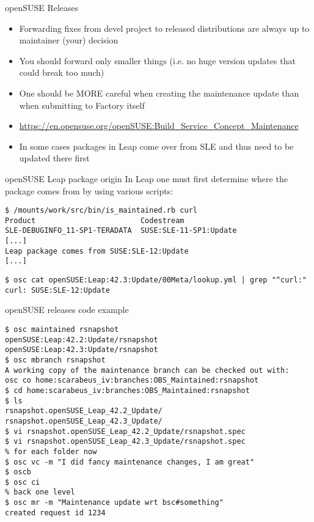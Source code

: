 \documentclass{beamer}
\begin{document}
\begin{frame}[t]{openSUSE Releases}
	\begin{itemize}
	\item Forwarding fixes from devel project to released distributions are always up to maintainer (your) decision
	\item You should forward only smaller things (i.e. no huge version updates that could break too much)
	\item One should be MORE careful when creating the maintenance update than when submitting to Factory itself
	\item \url{https://en.opensuse.org/openSUSE:Build\_Service\_Concept\_Maintenance}
	\item In some cases packages in Leap come over from SLE and thus need to be updated there first
	\end{itemize}
\end{frame}

\begin{frame}[fragile]{openSUSE Leap package origin}
In Leap one must first determine where the package comes from by using various
scripts:
\begin{small}
\begin{verbatim}$ /mounts/work/src/bin/is_maintained.rb curl
Product                        Codestream
SLE-DEBUGINFO_11-SP1-TERADATA  SUSE:SLE-11-SP1:Update
[...]
Leap package comes from SUSE:SLE-12:Update
[...]\end{verbatim}
\end{small}
\begin{small}
\begin{verbatim}$ osc cat openSUSE:Leap:42.3:Update/00Meta/lookup.yml | grep "^curl:"
curl: SUSE:SLE-12:Update\end{verbatim}
\end{small}
\end{frame}

\begin{frame}[fragile]{openSUSE releases code example}
	\begin{scriptsize}
	\begin{verbatim}
$ osc maintained rsnapshot
openSUSE:Leap:42.2:Update/rsnapshot
openSUSE:Leap:42.3:Update/rsnapshot
$ osc mbranch rsnapshot
A working copy of the maintenance branch can be checked out with:
osc co home:scarabeus_iv:branches:OBS_Maintained:rsnapshot
$ cd home:scarabeus_iv:branches:OBS_Maintained:rsnapshot
$ ls
rsnapshot.openSUSE_Leap_42.2_Update/  rsnapshot.openSUSE_Leap_42.3_Update/
$ vi rsnapshot.openSUSE_Leap_42.2_Update/rsnapshot.spec
$ vi rsnapshot.openSUSE_Leap_42.3_Update/rsnapshot.spec
% for each folder now
$ osc vc -m "I did fancy maintenance changes, I am great"
$ oscb
$ osc ci
% back one level
$ osc mr -m "Maintenance update wrt bsc#something"
created request id 1234
	\end{verbatim}
	\end{scriptsize}
\end{frame}
\end{document}
